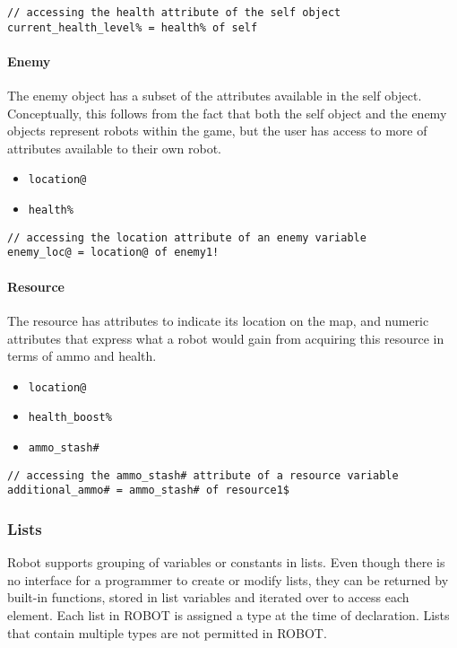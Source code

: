 \documentclass[a4paper]{article}
\begin{document}
\begin{verbatim}
// accessing the health attribute of the self object
current_health_level% = health% of self
\end{verbatim}

\paragraph{Enemy}

The enemy object has a subset of the attributes available in the self object.  Conceptually, this follows from the fact that both the self object and the enemy objects represent robots within the game, but the user has access to more of attributes available to their own robot.
\begin{itemize}
	\item \texttt{location@}
	\item \texttt{health\%}
\end{itemize}

\begin{verbatim}
// accessing the location attribute of an enemy variable 
enemy_loc@ = location@ of enemy1!
\end{verbatim}

\paragraph{Resource}

The resource has attributes to indicate its location on the map, and numeric attributes that express what a robot would gain from acquiring this resource in terms of ammo and health.
\begin{itemize}
	\item \texttt{location@}
	\item \texttt{health\_boost\%}
	\item \texttt{ammo\_stash\#\\}
\end{itemize}

\begin{verbatim}
// accessing the ammo_stash# attribute of a resource variable
additional_ammo# = ammo_stash# of resource1$
\end{verbatim}

\subsubsection{Lists}

Robot supports grouping of variables or constants in lists.  Even though there is no interface for a programmer to create or modify lists, they can be returned by built-in functions,  stored in list variables and iterated over to access each element.  Each list in ROBOT is assigned a type at the time of declaration.  Lists that contain multiple types are not permitted in ROBOT. 
\end{document}
